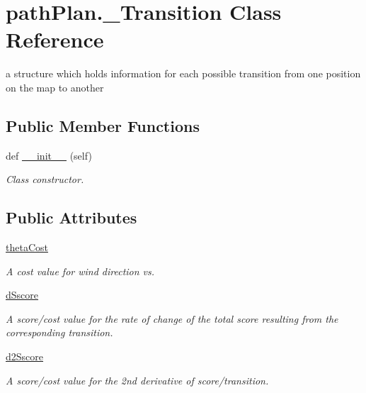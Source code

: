 \hypertarget{classpath_plan_1_1___transition}{}\section{path\+Plan.\+\_\+\+Transition Class Reference}
\label{classpath_plan_1_1___transition}


a structure which holds information for each possible transition from one position on the map to another  


\subsection*{Public Member Functions}
\begin{DoxyCompactItemize}
\item 
def \mbox{\hyperlink{classpath_plan_1_1___transition_ae6a85dd74adbd4cda96fded2ba5d398e}{\+\_\+\+\_\+init\+\_\+\+\_\+}} (self)
\begin{DoxyCompactList}\small\item\em Class constructor. \end{DoxyCompactList}\end{DoxyCompactItemize}
\subsection*{Public Attributes}
\begin{DoxyCompactItemize}
\item 
\mbox{\hyperlink{classpath_plan_1_1___transition_a405e375ebe2b2a5d66b50721c338c6e8}{theta\+Cost}}
\begin{DoxyCompactList}\small\item\em A cost value for wind direction vs. \end{DoxyCompactList}\item 
\mbox{\hyperlink{classpath_plan_1_1___transition_afa609d3874eb34ae2aa3efa67d762896}{d\+Sscore}}
\begin{DoxyCompactList}\small\item\em A score/cost value for the rate of change of the total score resulting from the corresponding transition. \end{DoxyCompactList}\item 
\mbox{\hyperlink{classpath_plan_1_1___transition_a03af53bb2bb866253742341b1c7b33fd}{d2\+Sscore}}
\begin{DoxyCompactList}\small\item\em A score/cost value for the 2nd derivative of score/transition. \end{DoxyCompactList}\end{DoxyCompactItemize}


